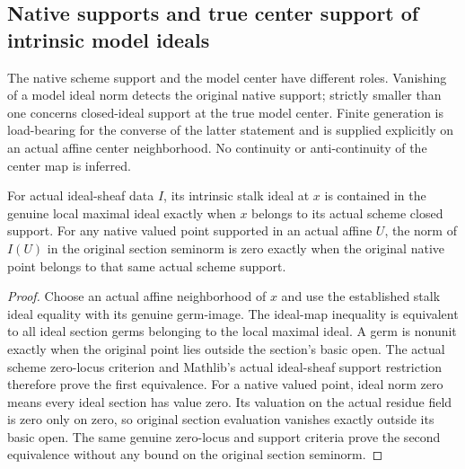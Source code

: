 \subsection{Native supports and true center support of intrinsic model ideals}
\label{subsec:native-model-ideal-supports}

The native scheme support and the model center have different roles.
Vanishing of a model ideal norm detects the original native support;
strictly smaller than one concerns closed-ideal support at the true model
center. Finite generation is load-bearing for the converse of the latter
statement and is supplied explicitly on an actual affine center neighborhood.
No continuity or anti-continuity of the center map is inferred.

\begin{lemma}
\label{scheme:actual-ideal-support-in-germs}
\leanok
{}
For actual ideal-sheaf data $I$, its intrinsic stalk ideal at $x$ is
contained in the genuine local maximal ideal exactly when $x$ belongs to
its actual scheme closed support. For any native valued point supported
in an actual affine $U$, the norm of $I(U)$ in the original section
seminorm is zero exactly when the original native point belongs to that
same actual scheme support.
\end{lemma}
\begin{proof}
Choose an actual affine neighborhood of $x$ and use the established stalk
ideal equality with its genuine germ-image. The ideal-map inequality is
equivalent to all ideal section germs belonging to the local maximal
ideal. A germ is nonunit exactly when the original point lies outside
the section's basic open. The actual scheme zero-locus criterion and
Mathlib's actual ideal-sheaf support restriction therefore prove the first
equivalence. For a native valued point, ideal norm zero means every ideal
section has value zero. Its valuation on the actual residue field is zero
only on zero, so original section evaluation vanishes exactly outside its
basic open. The same genuine zero-locus and support criteria prove the
second equivalence without any bound on the original section seminorm.
\end{proof}


